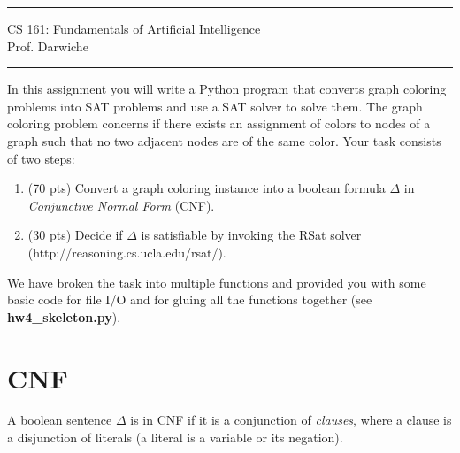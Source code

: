 \documentclass[10pt]{article}
\def\course{{\Large CS 161: Fundamentals of Artificial Intelligence}}
\def\quarter{Spring 2023}
\def\hw{Assignment 4}
\def\due{11:30pm, Tuesday, MAY 2}
\begin{document}
\noindent\rule{\textwidth}{.5mm}
\begin{center} \course\\
\vspace{1mm}Prof. Darwiche \\ 
\vspace{4mm}{\quarter\ -- \hw\ -- Due \due}
\end{center}
\noindent \rule{\textwidth}{.5mm}
\vspace{2mm}



In this assignment you will write a Python program that converts graph coloring problems into SAT problems and use a SAT solver to solve them. The graph coloring problem concerns if there exists an assignment of colors to nodes of a graph such that no two adjacent nodes are of the same color. Your task consists of two steps:

\begin{enumerate}
    \item (70 pts) Convert a graph coloring instance into a boolean formula $\Delta$ in {\em Conjunctive Normal Form} (CNF).
    \item (30 pts) Decide if $\Delta$ is satisfiable by invoking the RSat solver (http://reasoning.cs.ucla.edu/rsat/). 
\end{enumerate}

We have broken the task into multiple functions and provided you with some basic code for file I/O and for gluing all the functions together (see {\bf hw4\_skeleton.py}).


\section{CNF}\label{sec:CNF}
A boolean sentence $\Delta$ is in CNF if it is a conjunction of {\em clauses}, where a clause is a disjunction
of literals (a literal is a variable or its negation). 
\end{document}
